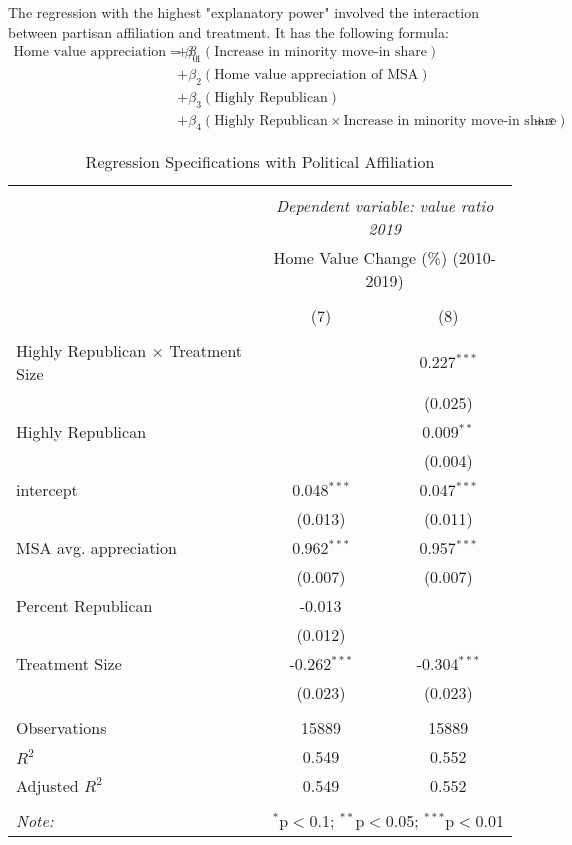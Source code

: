 \documentclass{article}
\begin{document}
The regression with the highest "explanatory power" involved the interaction between partisan affiliation and treatment. It has the following formula:
\begin{align*}
    \text{Home value appreciation}=\beta_0&+\beta_1(\text{Increase in minority move-in share})\\
    &+\beta_2(\text{Home value appreciation of MSA})\\
    &+\beta_3(\text{Highly Republican})\\
    &+\beta_4(\text{Highly Republican} \times \text{Increase in minority move-in share})+\varepsilon
\end{align*}
\begin{table}[H] \centering
    \caption{Regression Specifications with Political Affiliation}
    \begin{tabular}{@{\extracolsep{5pt}}lcc}
    \\[-1.8ex]\hline
    \hline \\[-1.8ex]
    & \multicolumn{2}{c}{\textit{Dependent variable: value ratio 2019}} \
    \cr \cline{2-3}
    \\[-1.8ex] & \multicolumn{2}{c}{Home Value Change (\%) (2010-2019)}  \\
    \\[-1.8ex] & (7) & (8) \\
    \hline \\[-1.8ex]
    Highly Republican $\times$ Treatment Size & & 0.227$^{***}$ \\
   & & (0.025) \\
    Highly Republican & & 0.009$^{**}$ \\
   & & (0.004) \\
    intercept & 0.048$^{***}$ & 0.047$^{***}$ \\
   & (0.013) & (0.011) \\
   MSA avg. appreciation & 0.962$^{***}$ & 0.957$^{***}$ \\
   & (0.007) & (0.007) \\
    Percent Republican & -0.013$^{}$ & \\
   & (0.012) & \\
    Treatment Size & -0.262$^{***}$ & -0.304$^{***}$ \\
   & (0.023) & (0.023) \\
   \hline \\[-1.8ex]
    Observations & 15889 & 15889 \\
    $R^2$ & 0.549 & 0.552 \\
    Adjusted $R^2$ & 0.549 & 0.552 \\
    \\[-1.8ex]
    \hline\hline 
    \textit{Note:} & \multicolumn{2}{r}{$^{*}$p$<$0.1; $^{**}$p$<$0.05; $^{***}$p$<$0.01} \\
    \end{tabular}
\end{table}
\end{document}

